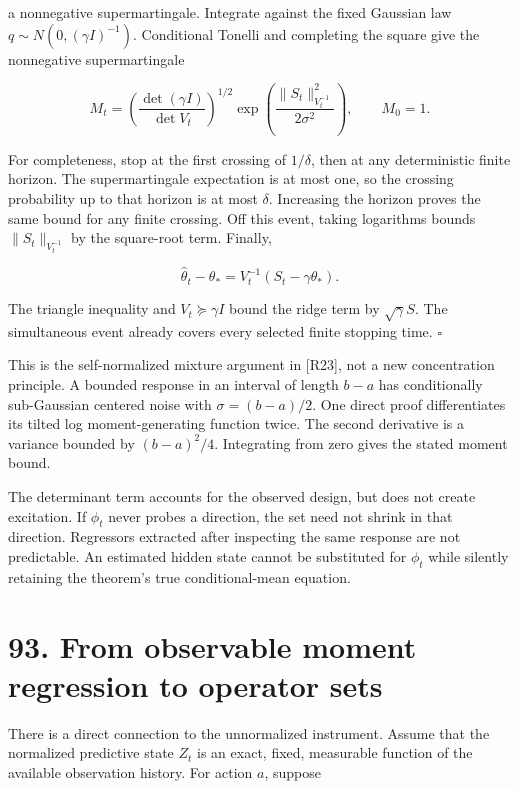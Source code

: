 \documentclass[11pt,letterpaper]{article}
\begin{document}
a nonnegative supermartingale. Integrate against the fixed Gaussian law
\(q\sim N(0,(\gamma I)^{-1})\). Conditional Tonelli and completing the
square give the nonnegative supermartingale

\[
M_t=
\left(\frac{\det(\gamma I)}{\det V_t}\right)^{1/2}
\exp\left(\frac{\|S_t\|_{V_t^{-1}}^2}{2\sigma^2}\right),
\qquad M_0=1.
\]

For completeness, stop at the first crossing of \(1/\delta\), then at
any deterministic finite horizon. The supermartingale expectation is at
most one, so the crossing probability up to that horizon is at most
\(\delta\). Increasing the horizon proves the same bound for any finite
crossing. Off this event, taking logarithms bounds
\(\|S_t\|_{V_t^{-1}}\) by the square-root term. Finally,

\[
\widehat\theta_t-\theta_*
=V_t^{-1}(S_t-\gamma\theta_*).
\]

The triangle inequality and \(V_t\succeq\gamma I\) bound the ridge term
by \(\sqrt\gamma S\). The simultaneous event already covers every
selected finite stopping time. \(\square\)

This is the self-normalized mixture argument in {[}R23{]}, not a new
concentration principle. A bounded response in an interval of length
\(b-a\) has conditionally sub-Gaussian centered noise with
\(\sigma=(b-a)/2\). One direct proof differentiates its tilted log
moment-generating function twice. The second derivative is a variance
bounded by \((b-a)^2/4\). Integrating from zero gives the stated moment
bound.

The determinant term accounts for the observed design, but does not
create excitation. If \(\phi_t\) never probes a direction, the set need
not shrink in that direction. Regressors extracted after inspecting the
same response are not predictable. An estimated hidden state cannot be
substituted for \(\phi_t\) while silently retaining the theorem's true
conditional-mean equation.

\section{93. From observable moment regression to operator
sets}\label{from-observable-moment-regression-to-operator-sets}

There is a direct connection to the unnormalized instrument. Assume that
the normalized predictive state \(Z_t\) is an exact, fixed, measurable
function of the available observation history. For action \(a\), suppose
\end{document}
